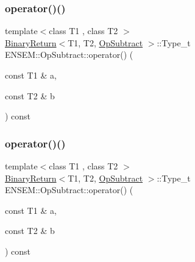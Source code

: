 \subsubsection{\texorpdfstring{operator()()}{operator()()}\hspace{0.1cm}{\footnotesize\ttfamily [1/3]}}
{\footnotesize\ttfamily template$<$class T1 , class T2 $>$ \\
\mbox{\hyperlink{structENSEM_1_1BinaryReturn}{Binary\+Return}}$<$T1, T2, \mbox{\hyperlink{structENSEM_1_1OpSubtract}{Op\+Subtract}} $>$\+::Type\+\_\+t E\+N\+S\+E\+M\+::\+Op\+Subtract\+::operator() (\begin{DoxyParamCaption}\item[{const T1 \&}]{a,  }\item[{const T2 \&}]{b }\end{DoxyParamCaption}) const\hspace{0.3cm}{\ttfamily [inline]}}

\mbox{\label{structENSEM_1_1OpSubtract_ac246484950e9df9cb101370fd5f7f6b0}} 
\subsubsection{\texorpdfstring{operator()()}{operator()()}\hspace{0.1cm}{\footnotesize\ttfamily [2/3]}}
{\footnotesize\ttfamily template$<$class T1 , class T2 $>$ \\
\mbox{\hyperlink{structENSEM_1_1BinaryReturn}{Binary\+Return}}$<$T1, T2, \mbox{\hyperlink{structENSEM_1_1OpSubtract}{Op\+Subtract}} $>$\+::Type\+\_\+t E\+N\+S\+E\+M\+::\+Op\+Subtract\+::operator() (\begin{DoxyParamCaption}\item[{const T1 \&}]{a,  }\item[{const T2 \&}]{b }\end{DoxyParamCaption}) const\hspace{0.3cm}{\ttfamily [inline]}}

\mbox{\label{structENSEM_1_1OpSubtract_ac246484950e9df9cb101370fd5f7f6b0}} 
